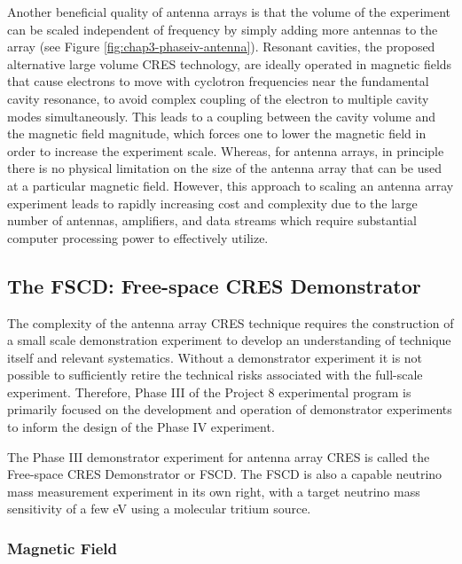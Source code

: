 Another beneficial quality of antenna arrays is that the volume of the experiment can be scaled independent of frequency by simply adding more antennas to the array (see Figure \ref{fig:chap3-phaseiv-antenna}). Resonant cavities, the proposed alternative large volume CRES technology, are ideally operated in magnetic fields that cause electrons to move with cyclotron frequencies near the fundamental cavity resonance, to avoid complex coupling of the electron to multiple cavity modes simultaneously. This leads to a coupling between the cavity volume and the magnetic field magnitude, which forces one to lower the magnetic field in order to increase the experiment scale. Whereas, for antenna arrays, in principle there is no physical limitation on the size of the antenna array that can be used at a particular magnetic field. However, this approach to scaling an antenna array experiment leads to rapidly increasing cost and complexity due to the large number of antennas, amplifiers, and data streams which require substantial computer processing power to effectively utilize.

\subsection{The FSCD: Free-space CRES Demonstrator}

The complexity of the antenna array CRES technique requires the construction of a small scale demonstration experiment to develop an understanding of technique itself and relevant systematics. Without a demonstrator experiment it is not possible to sufficiently retire the technical risks associated with the full-scale experiment. Therefore, Phase III of the Project 8 experimental program is primarily focused on the development and operation of demonstrator experiments to inform the design of the Phase IV experiment.

The Phase III demonstrator experiment for antenna array CRES is called the Free-space CRES Demonstrator or FSCD. The FSCD is also a capable neutrino mass measurement experiment in its own right, with a target neutrino mass sensitivity of a few eV using a molecular tritium source.  

\subsubsection*{Magnetic Field}

